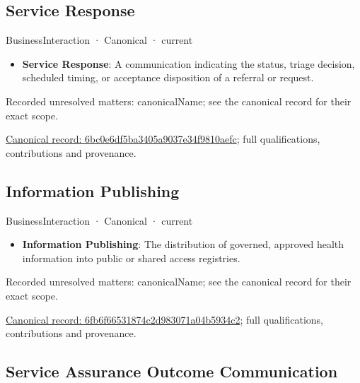\subsection{Service Response}

\label{element:6bc0e6df5ba3405a9037e34f9810aefc}
{\small BusinessInteraction · Canonical · current}\par

\begin{itemize}


\item \textbf{Service Response}: A communication indicating the status, triage decision, scheduled timing, or acceptance disposition of a referral or request.

\end{itemize}

{\small Recorded unresolved matters: canonicalName; see the canonical record for their exact scope.}\par
{\footnotesize \href{../../../../continuum/business/business-interaction/6bc0e6df5ba3405a9037e34f9810aefc.md}{Canonical record: 6bc0e6df5ba3405a9037e34f9810aefc}; full qualifications, contributions and provenance.}\par
\subsection{Information Publishing}

\label{element:6fb6f66531874c2d983071a04b5934c2}
{\small BusinessInteraction · Canonical · current}\par

\begin{itemize}


\item \textbf{Information Publishing}: The distribution of governed, approved health information into public or shared access registries.

\end{itemize}

{\small Recorded unresolved matters: canonicalName; see the canonical record for their exact scope.}\par
{\footnotesize \href{../../../../continuum/business/business-interaction/6fb6f66531874c2d983071a04b5934c2.md}{Canonical record: 6fb6f66531874c2d983071a04b5934c2}; full qualifications, contributions and provenance.}\par
\subsection{Service Assurance Outcome Communication}

